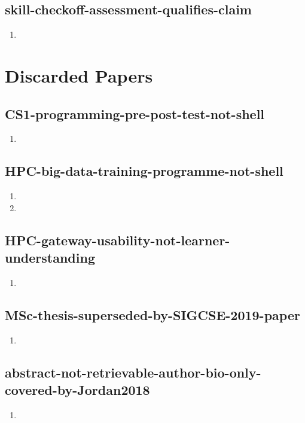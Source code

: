 \documentclass{article}
\begin{document}
\subsection{skill-checkoff-assessment-qualifies-claim}
\begin{enumerate}
\item {}
\end{enumerate}

\section{Discarded Papers}
\subsection{CS1-programming-pre-post-test-not-shell}
\begin{enumerate}
\item {}
\end{enumerate}

\subsection{HPC-big-data-training-programme-not-shell}
\begin{enumerate}
\item {}
\item {}
\end{enumerate}

\subsection{HPC-gateway-usability-not-learner-understanding}
\begin{enumerate}
\item {}
\end{enumerate}

\subsection{MSc-thesis-superseded-by-SIGCSE-2019-paper}
\begin{enumerate}
\item {}
\end{enumerate}

\subsection{abstract-not-retrievable-author-bio-only-covered-by-Jordan2018}
\begin{enumerate}
\item {}
\end{enumerate}
\end{document}
